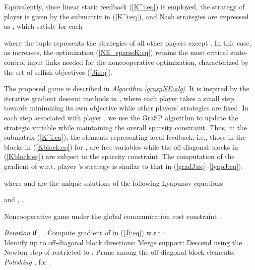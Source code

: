 \documentclass[12pt, draftclsnofoot,onecolumn]{IEEEtran}
\begin{document}
\noindent Equivalently, since linear static feedback (\ref{K^i:eq}) is employed, the strategy of player  is given by the submatrix  in (\ref{K^i:eq}), and Nash strategies are expressed as , which satisfy for each 

\noindent where the tuple  represents the strategies of all other players except . In this case, as  increases, the optimization (\ref{NE_sparseK:eq}) retains the most critical state-control input links needed for the noncooperative optimization, characterized by the set of selfish objectives (\ref{Ji:eq}).

The proposed game is described in {\it Algorithm \ref{graspNE:alg}}. It is inspired by the iterative gradient descent methods in \cite{ratliff2013characterization,li2013designing}, where each player takes a small step towards minimizing its own objective while other players' strategies are fixed. In each step associated with player , we use the GraSP algorithm \cite{bahmani2013greedy} to update the strategic variable  while maintaining the overall sparsity constraint. Thus, in the submatrix  (\ref{K^i:eq}), the elements representing local feedback, i.e., those in the blocks  in (\ref{Kblock:eq}) for , are free variables while the off-diagonal blocks in (\ref{Kblock:eq}) are subject to the sparsity constraint. The computation of the gradient of  w.r.t. player 's strategy  is similar to that in (\ref{gradJ:eq}--\ref{lyapJ:eq}).

\noindent where  and  are the unique solutions of the following Lyapunov equations

\noindent and , .

\begin{algorithm}[!b]
	 \caption{Noncooperative game under the global communication cost constraint .}
	\begin{algorithmic}
\parState{}
 {\it Iteration} 
	\State{}
	\For { = }
 {if , .}
	 {Compute gradient of  in (\ref{Ji:eq}) w.r.t :\\  }
	 {Identify up to  off-diagonal block directions: }
	 {Merge support: }
	 {Descend using the Newton step of  restricted to : }
	 {Prune among the off-diagonal block elements: }
	\EndFor
    \EndWhile
	 {\it Polishing}
	\State , for .
	\For{}
	\EndFor
	\EndWhile
\end{algorithmic}
	 \label{graspNE:alg}
\end{algorithm}
\end{document}
